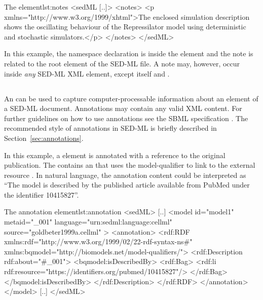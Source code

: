 
\begin{myXmlLst}{The  element}{lst:notes}
<sedML [..]>
	<notes>
  		<p xmlns="http://www.w3.org/1999/xhtml">The enclosed simulation description shows the oscillating behaviour of the Repressilator model using deterministic and stochastic simulators.</p>
	</notes>
</sedML>
\end{myXmlLst}

In this example, the namespace declaration is inside the  element and the note is related to the  root element of the SED-ML file. A note may, however, occur inside \emph{any} SED-ML XML element, except  itself and \Annotation.


\subsection{}
\label{class:annotation}

An  can be used to capture computer-processable information about an element of a SED-ML document. Annotations may contain any valid XML content. For further guidelines on how to use annotations see the SBML specification \citep{HBH+10}. The recommended style of annotations in SED-ML is briefly described in Section~\ref{sec:annotations}.

 In this example, a \hyperref[class:model]{} element is annotated with a reference to the original publication. The  contains an  that uses the model-qualifier  to link to the external resource . In natural language, the annotation content could be interpreted as ``The model is described by the published article available from PubMed under the identifier 10415827''.

\begin{myXmlLst}{The annotation element}{lst:annotation}
<sedML>
	[..]
	<model id="model1" metaid="_001" language="urn:sedml:language:cellml" source="goldbeter1999a.cellml" >
		<annotation>
    		<rdf:RDF xmlns:rdf="http://www.w3.org/1999/02/22-rdf-syntax-ns#" xmlns:bqmodel="http://biomodels.net/model-qualifiers/">
				<rdf:Description rdf:about="#_001">
				<bqmodel:isDescribedBy>
				<rdf:Bag>
					<rdf:li rdf:resource="https://identifiers.org/pubmed/10415827"/>
				</rdf:Bag>
				</bqmodel:isDescribedBy>
    			</rdf:Description>
			</rdf:RDF>
		</annotation>
	</model>
	[..]
</sedML>
\end{myXmlLst}


